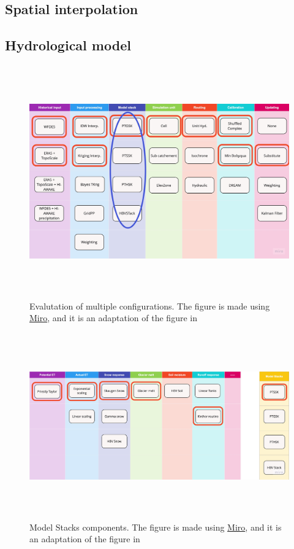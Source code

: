 \subsection{Spatial interpolation}




\subsection{Hydrological model}





\begin{figure}[ht]
    \centering
    \includegraphics[width=1.1\textwidth,height=10cm]{figures/methods/configs-4.jpg}
    \caption{Evalutation of multiple configurations. The figure is made using \href{https://miro.com}{Miro}, and it is an adaptation of the figure in \autocite{burkhartShyftV4Framework2021}}
    \label{fig:configurations}
\end{figure}

\begin{figure}[ht]
    \centering
    \includegraphics[width=1.1\textwidth,height=8cm]{figures/methods/configs.jpg}
    \caption{Model Stacks components. The figure is made using \href{https://miro.com}{Miro}, and it is an adaptation of the figure in \autocite{burkhartShyftV4Framework2021}}
    \label{fig:model_stack}
\end{figure}


